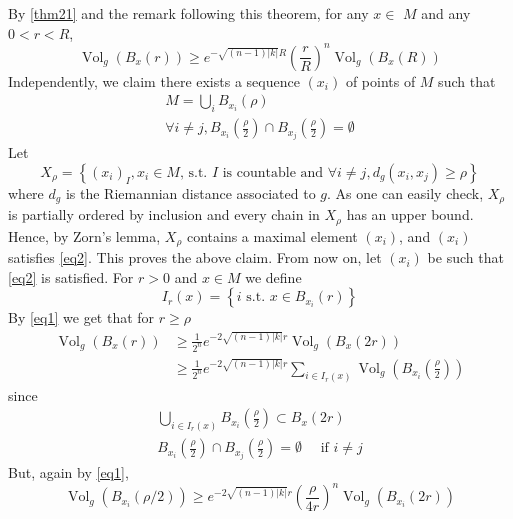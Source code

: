 \documentclass[12pt,hyperref,a4paper,UTF8]{ctexart}
\begin{document}
\begin{Proof}
    By \autoref{thm21} and the remark following this theorem, for any $x \in$ $M$ and any $0<r<R$,
    \begin{equation}
    \operatorname{Vol}_g\left(B_x(r)\right) \geq e^{-\sqrt{(n-1)|k|} R}\left(\frac{r}{R}\right)^n \operatorname{Vol}_g\left(B_x(R)\right)
    \label{eq1}
    \end{equation}
    Independently, we claim there exists a sequence $\left(x_i\right)$ of points of $M$ such that
    \begin{equation}
    \begin{array}{l}
    M=\bigcup_i B_{x_i}(\rho) \\
    \forall i \neq j, B_{x_i}\left(\frac{\rho}{2}\right) \cap B_{x_j}\left(\frac{\rho}{2}\right)=\emptyset
    \end{array}
    \label{eq2}
    \end{equation}
    Let
    $$
    X_\rho=\left\{\left(x_i\right)_I, x_i \in M \text {, s.t. } I \text { is countable and } \forall i \neq j, d_g\left(x_i, x_j\right) \geq \rho\right\}
    $$
    where $d_g$ is the Riemannian distance associated to $g$. As one can easily check, $X_\rho$ is partially ordered by inclusion and every chain in $X_\rho$ has an upper bound. Hence, by Zorn's lemma, $X_\rho$ contains a maximal element $\left(x_i\right)$, and $\left(x_i\right)$ satisfies \autoref{eq2}. This proves the above claim. From now on, let $\left(x_i\right)$ be such that \autoref{eq2} is satisfied. For $r>0$ and $x \in M$ we define
    $$
    I_r(x)=\left\{i \text { s.t. } x \in B_{x_i}(r)\right\}
    $$
    By \autoref{eq1} we get that for $r \geq \rho$
    $$
    \begin{aligned}
    \operatorname{Vol}_g\left(B_x(r)\right) & \geq \frac{1}{2^n} e^{-2 \sqrt{(n-1)|k|} r} \operatorname{Vol}_g\left(B_x(2 r)\right) \\
    & \geq \frac{1}{2^n} e^{-2 \sqrt{(n-1)|k|} r} \sum_{i \in I_{r}(x)} \operatorname{Vol}_g\left(B_{x_i}\left(\frac{\rho}{2}\right)\right)
    \end{aligned}
    $$
    since
    $$
    \begin{array}{l}
    \bigcup_{i \in I_r(x)} B_{x_i}\left(\frac{\rho}{2}\right) \subset B_x(2 r) \\
    B_{x_i}\left(\frac{\rho}{2}\right) \cap B_{x_j}\left(\frac{\rho}{2}\right)=\emptyset \quad \text { if } i \neq j
    \end{array}
    $$
    But, again by \autoref{eq1},
    $$
    \operatorname{Vol}_g\left(B_{x_i}(\rho / 2)\right) \geq e^{-2 \sqrt{(n-1)|k|} r}\left(\frac{\rho}{4 r}\right)^n \operatorname{Vol}_g\left(B_{x_i}(2 r)\right)
$$
\end{Proof}
\end{document}
